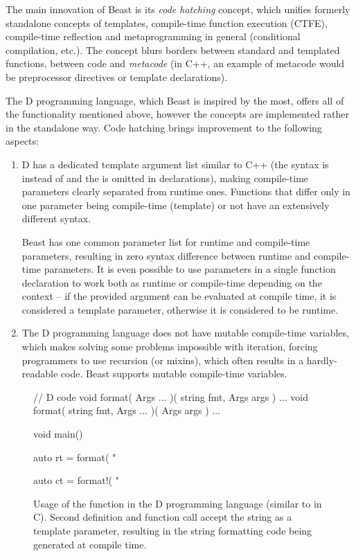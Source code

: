 \documentclass{ExcelAtFIT}
\begin{document}
The main innovation of Beast is its \textit{code hatching} concept, which unifies formerly standalone concepts of templates, compile-time function execution (CTFE), compile-time reflection and metaprogramming in general (conditional compilation, etc.). The concept blurs borders between standard and templated functions, between code and \textit{metacode} (in C++, an example of metacode would be preprocessor directives or template declarations).

The D programming language, which Beast is inspired by the most, offers all of the functionality mentioned above, however the concepts are implemented rather in the standalone way. Code hatching brings improvement to the following aspects:
\begin{enumerate}
	\item D has a dedicated template argument list similar to C++ (the syntax is  instead of  and the \inlineDCode{!} is omitted in declarations), making compile-time parameters clearly separated from runtime ones. Functions that differ only in one parameter being compile-time (template) or not have an extensively different syntax.
 
 	Beast has one common parameter list for runtime and compile-time parameters, resulting in zero syntax difference between runtime and com\-pile-time parameters. It is even possible to use parameters in a single function declaration to work both as runtime or compile-time depending on the context -- if the provided argument can be evaluated at compile time, it is considered a template parameter, otherwise it is considered to be runtime.

	\item The D programming language does not have mutable compile-time variables, which makes solving some problems impossible with iteration, forcing programmers to use recursion (or mixins), which often results in a hardly-readable code. Beast supports mutable compile-time variables.
\end{enumerate}

\begin{figure}[h]
	\begin{dcode}
		// D code
		void format( Args ... )( string fmt, Args args ) { ... }
		void format( string fmt, Args ... )( Args args ) { ... }
		
		void main() {
			auto rt = format( "%
			
			auto ct = format!( "%
		}
	\end{dcode}
	\caption{Usage of the  function in the D programming language (similar to  in C). Second  definition and function call accept the  string as a template parameter, resulting in the string formatting code being generated at compile time.}
	\label{fig:dFormat}
\end{figure}
\end{document}
